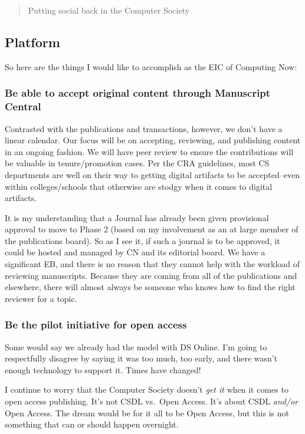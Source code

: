 \documentclass[11pt,english]{luclet}
\begin{document}
\begin{quote}
Putting social back in the Computer Society

\end{quote}
\subsection{Platform}

So here are the things I would like to accomplish as the EIC of
Computing Now:

\subsubsection{Be able to accept original content through Manuscript
Central}

Contrasted with the publications and transactions, however, we don't
have a linear calendar. Our focus will be on accepting, reviewing, and
publishing content in an ongoing fashion. We will have peer review to
ensure the contributions will be valuable in tenure/promotion cases. Per
the CRA guidelines, most CS departments are well on their way to getting
digital artifacts to be accepted--even within colleges/schools that
otherwise are stodgy when it comes to digital artifacts.

It is my understanding that a Journal has already been given provisional
approval to move to Phase 2 (based on my involvement as an at large
member of the publications board). So as I see it, if such a journal is
to be approved, it could be hosted and managed by CN and its editorial
board. We have a significant EB, and there is no reason that they cannot
help with the workload of reviewing manuscripts. Because they are coming
from all of the publications and elsewhere, there will almost always be
someone who knows how to find the right reviewer for a topic.

\subsubsection{Be the pilot initiative for open access}

Some would say we already had the model with DS Online. I'm going to
respectfully disagree by saying it was too much, too early, and there
wasn't enough technology to support it. Times have changed!

I continue to worry that the Computer Society doesn't \emph{get it} when
it comes to open access publishing. It's not CSDL vs.~Open Access. It's
about CSDL \emph{and/or} Open Access. The dream would be for it all to
be Open Access, but this is not something that can or should happen
overnight.
\end{document}
